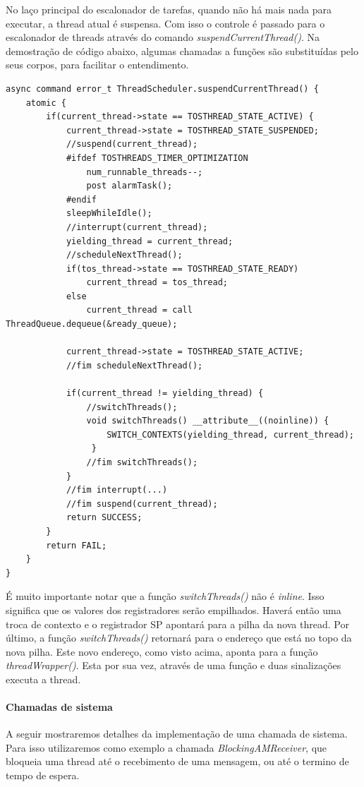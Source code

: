 No laço principal do escalonador de tarefas, quando não há mais nada para executar, a thread atual é suspensa. Com isso
o controle é passado para o escalonador de threads através do comando \textit{suspendCurrentThread()}. Na demostração de
código abaixo, algumas chamadas a funções são substituídas pelo seus corpos, para facilitar o entendimento.
\begin{lstlisting}
async command error_t ThreadScheduler.suspendCurrentThread() {
    atomic {
        if(current_thread->state == TOSTHREAD_STATE_ACTIVE) {
            current_thread->state = TOSTHREAD_STATE_SUSPENDED;
            //suspend(current_thread);
            #ifdef TOSTHREADS_TIMER_OPTIMIZATION
                num_runnable_threads--;
                post alarmTask();
            #endif
            sleepWhileIdle();
            //interrupt(current_thread);
            yielding_thread = current_thread;
            //scheduleNextThread();
            if(tos_thread->state == TOSTHREAD_STATE_READY)
                current_thread = tos_thread;
            else
                current_thread = call ThreadQueue.dequeue(&ready_queue);

            current_thread->state = TOSTHREAD_STATE_ACTIVE;
            //fim scheduleNextThread();

            if(current_thread != yielding_thread) {
                //switchThreads();
                void switchThreads() __attribute__((noinline)) {
                    SWITCH_CONTEXTS(yielding_thread, current_thread);
                 }
                //fim switchThreads();
            }
            //fim interrupt(...)
            //fim suspend(current_thread);
            return SUCCESS;
        }
        return FAIL;
    }
}
\end{lstlisting}
É muito importante notar que a função \textit{switchThreads()} não é \textit{inline}. Isso significa que os valores dos
registradores serão empilhados. Haverá então uma troca de contexto e o registrador SP apontará para a pilha da nova
thread. Por último, a função \textit{switchThreads()} retornará para o endereço que está no topo da nova pilha. Este
novo endereço, como visto acima, aponta para a função \textit{threadWrapper()}. Esta por sua vez, através de uma função
e duas sinalizações executa a thread.


\paragraph{Chamadas de sistema}
A seguir mostraremos detalhes da implementação de uma chamada de sistema. Para isso utilizaremos como exemplo a chamada
\textit{BlockingAMReceiver}, que bloqueia uma thread até o recebimento de uma mensagem, ou até o termino de tempo de
espera.

